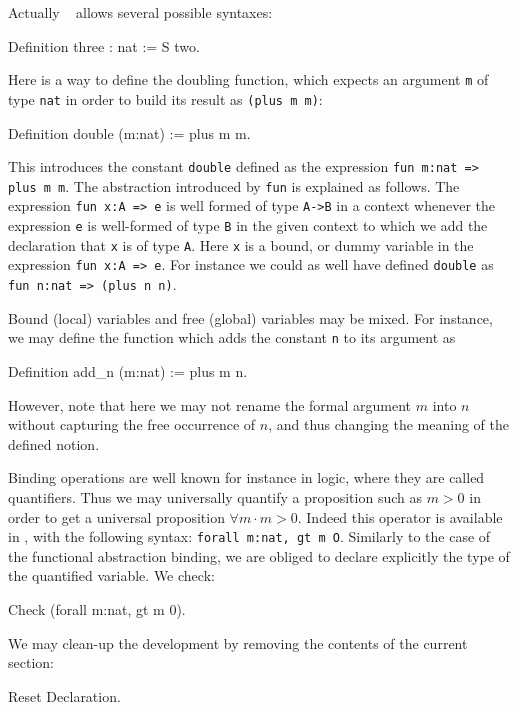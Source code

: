 \documentclass[11pt,a4paper]{book}
\begin{document}
Actually \Coq~ allows several possible syntaxes:
\begin{coq_example}
Definition three : nat := S two.
\end{coq_example}

Here is a way to define the doubling function, which expects an
argument \verb:m: of type \verb:nat: in order to build its result as
\verb:(plus m m)::

\begin{coq_example}
Definition double (m:nat) := plus m m.
\end{coq_example}
This introduces the constant \texttt{double} defined as the
expression \texttt{fun m:nat => plus m m}.
The abstraction introduced by \texttt{fun} is explained as follows. The expression
\verb+fun x:A => e+ is well formed of type \verb+A->B+ in a context
whenever the expression \verb+e+ is well-formed of type \verb+B+ in 
the given context to which we add the declaration that \verb+x+
is of type \verb+A+. Here \verb+x+ is a bound, or dummy variable in
the expression \verb+fun x:A => e+. For instance we could as well have
defined \verb:double: as \verb+fun n:nat => (plus n n)+.

Bound (local) variables and free (global) variables may be mixed.
For instance, we may define the function which adds the constant \verb:n:
to its argument as
\begin{coq_example}
Definition add_n (m:nat) := plus m n.
\end{coq_example}
However, note that here we may not rename the formal argument $m$ into $n$
without capturing the free occurrence of $n$, and thus changing the meaning
of the defined notion.

Binding operations are well known for instance in logic, where they
are called quantifiers.  Thus we may universally quantify a
proposition such as $m>0$ in order to get a universal proposition
$\forall m\cdot m>0$. Indeed this operator is available in \Coq, with
the following syntax: \verb+forall m:nat, gt m O+. Similarly to the
case of the functional abstraction binding, we are obliged to declare
explicitly the type of the quantified variable. We check:
\begin{coq_example}
Check (forall m:nat, gt m 0).
\end{coq_example}
We may clean-up the development by removing the contents of the
current section:
\begin{coq_example}
Reset Declaration.
\end{coq_example}
\end{document}
